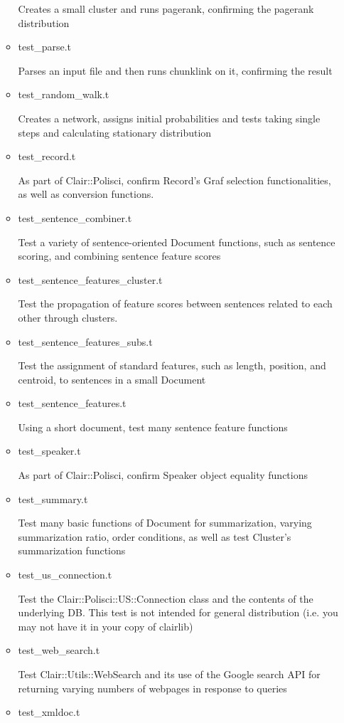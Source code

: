 \begin{itemize}
\begin{itemize}
 Creates a small cluster and runs pagerank, confirming
 the pagerank distribution
  \item test\_parse.t

 Parses an input file and then runs chunklink on it, confirming
 the result 
  \item test\_random\_walk.t

 Creates a network, assigns initial probabilities and tests
 taking single steps and calculating stationary distribution 
  \item test\_record.t

 As part of Clair::Polisci, confirm Record's Graf selection
 functionalities, as well as conversion functions. 
  \item test\_sentence\_combiner.t

 Test a variety of sentence-oriented Document functions, such
 as sentence scoring, and combining sentence feature scores 
  \item test\_sentence\_features\_cluster.t

 Test the propagation of feature scores between sentences
 related to each other through clusters. 
  \item test\_sentence\_features\_subs.t

 Test the assignment of standard features, such as length,
 position, and centroid, to sentences in a small Document 
  \item test\_sentence\_features.t

 Using a short document, test many sentence feature functions 
  \item test\_speaker.t

 As part of Clair::Polisci, confirm Speaker object equality
 functions 
  \item test\_summary.t

 Test many basic functions of Document for summarization,
 varying summarization ratio, order conditions, as well as
 test Cluster's summarization functions 
  \item test\_us\_connection.t

 Test the Clair::Polisci::US::Connection class and the
 contents of the underlying DB.  This test is not intended
 for general distribution (i.e. you may not have it in your
 copy of clairlib) 
  \item test\_web\_search.t

 Test Clair::Utils::WebSearch and its use of the Google
 search API for returning varying numbers of webpages
 in response to queries 
  \item test\_xmldoc.t


\end{itemize}
\end{itemize}
